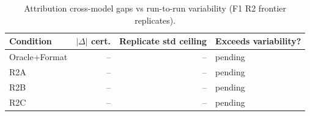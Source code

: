 \begin{table}[t]
  \centering
  \caption{Attribution cross-model gaps vs run-to-run variability (F1 R2 frontier replicates).}
  \label{tab:extension-stability-vs-cross-model}
  \footnotesize
  \begin{tabular}{@{}lrrl@{}}
    \toprule
    Condition & $|\Delta|$ cert. & Replicate std ceiling & Exceeds variability? \\
    \midrule
    Oracle+Format & -- & -- & pending \\
    R2A & -- & -- & pending \\
    R2B & -- & -- & pending \\
    R2C & -- & -- & pending \\
    \bottomrule
  \end{tabular}
\end{table}
